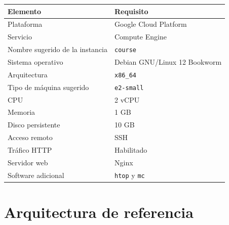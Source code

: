 \documentclass[
  coursetitle={Cómputo Nube y Tecnologías Emergentes},
  coursehours={96},
  coursedate={Verano 2026},
  doctype={Práctica},
  otherlangs={english,french},
  authorname={Lázaro},
  authorsurname={Bustio-Martínez},
  authortitle={PhD},
  role={Profesor Investigador},
  email={lbustio@inaoe.mx},
  phone={5559504000},
  ext={7459},
  institution={Instituto Nacional de Astrofísica, Óptica y Electrónica (INAOE)},
  department={Maestría en Ciencias en Tecnologías de Seguridad},
  address={Luis Enrique Erro 1, Sta. Ma. Tonantzintla, San Andrés Cholula, CP 72840, Puebla, México},
  margin={0.5in}
]{../../lbustio_lecture_notes}
\begin{document}
\begin{table}[h]
\centering
\renewcommand{\arraystretch}{1.15}
\begin{tabularx}{\textwidth}{|p{5.2cm}|Y|}
\hline
\textbf{Elemento} & \textbf{Requisito} \\
\hline
Plataforma & Google Cloud Platform \\
\hline
Servicio & Compute Engine \\
\hline
Nombre sugerido de la instancia & \texttt{course} \\
\hline
Sistema operativo & Debian GNU/Linux 12 Bookworm \\
\hline
Arquitectura & \texttt{x86\_64} \\
\hline
Tipo de máquina sugerido & \texttt{e2-small} \\
\hline
CPU & 2 vCPU \\
\hline
Memoria & 1 GB \\
\hline
Disco persistente & 10 GB \\
\hline
Acceso remoto & SSH \\
\hline
Tráfico HTTP & Habilitado \\
\hline
Servidor web & Nginx \\
\hline
Software adicional & \texttt{htop} y \texttt{mc} \\
\hline
\end{tabularx}
\end{table}

\section{Arquitectura de referencia}
\end{document}
